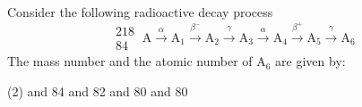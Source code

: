 \item Consider the following radioactive decay process
    \[
    \begin{array}{c}
    218 \\
    84 
    \end{array}
    \ \text{A} \xrightarrow{\alpha} \text{A}_1 \xrightarrow{\beta^-} \text{A}_2 \xrightarrow{\gamma} \text{A}_3 \xrightarrow{\alpha} \text{A}_4 \xrightarrow{\beta^+} \text{A}_5 \xrightarrow{\gamma} \text{A}_6
    \]
    The mass number and the atomic number of \(\text{A}_6\) are given by:
    \begin{tasks}(2)
         and 84
         and 82
         and 80
         and 80
    \end{tasks}